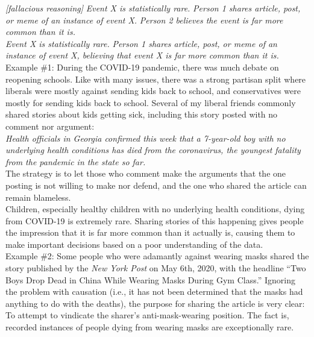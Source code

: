 \documentclass[a4paper,12pt,single,pdftex]{scrbook}
\begin{document}
    
      {\em [fallacious reasoning]} \newline
{\em Event X is statistically rare.} \newline
{\em Person 1 shares article, post, or meme of an instance of event X.} \newline
{\em Person 2 believes the event is far more common than it is.}
    \\

    
      {\em Event X is statistically rare.} \newline
{\em Person 1 shares article, post, or meme of an instance of event X, believing that event X is far more common than it is.}
    \\

    
      Example \#1: During the COVID-19 pandemic, there was much debate on reopening schools. Like with many issues, there was a strong partisan split where liberals were mostly against sending kids back to school, and conservatives were mostly for sending kids back to school. Several of my liberal friends commonly shared stories about kids getting sick, including this story posted with no comment nor argument:
    \\

    
      {\em Health officials in Georgia confirmed this week that a 7-year-old boy with no underlying health conditions has died from the coronavirus, the youngest fatality from the pandemic in the state so far.}
    \\

    
      The strategy is to let those who comment make the arguments that the one posting is not willing to make nor defend, and the one who shared the article can remain blameless.
    \\

    
      Children, especially healthy children with no underlying health conditions, dying from COVID-19 is extremely rare. Sharing stories of this happening gives people the impression that it is far more common than it actually is, causing them to make important decisions based on a poor understanding of the data.
    \\

    
      Example \#2: Some people who were adamantly against wearing masks shared the story published by the {\em New York Post} on May 6th, 2020, with the headline “Two Boys Drop Dead in China While Wearing Masks During Gym Class.” Ignoring the problem with causation (i.e., it has not been determined that the masks had anything to do with the deaths), the purpose for sharing the article is very clear: To attempt to vindicate the sharer’s anti-mask-wearing position. The fact is, recorded instances of people dying from wearing masks are exceptionally rare.
    \\
\end{document}
